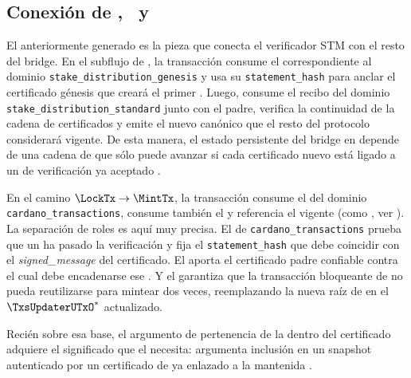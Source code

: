 \subsection{Conexión de \texorpdfstring{\UTxOs, \StakeDistTx\ y \MintTx}{UTxOs, StakeDistTx y MintTx}}

El \ProofReceipt anteriormente generado es la pieza que conecta el verificador STM con el resto del bridge. En el subflujo de \StakeDistribution, la transacción \StakeDistributionGenesisTxTemplate consume el \ProofReceipt correspondiente al dominio \texttt{stake\_distribution\_genesis} y usa su \texttt{statement\_hash} para anclar el certificado génesis que creará el primer \StakeDistributionUTxO. Luego, \StakeDistributionStandardTxTemplate consume el recibo del dominio \texttt{stake\_distribution\_standard} junto con el \StakeDistributionUTxO padre, verifica la continuidad de la cadena de certificados y emite el nuevo \StakeDistributionUTxO canónico que el resto del protocolo considerará vigente. De esta manera, el estado persistente del bridge en \ChainB depende de una cadena de \UTxOs que sólo puede avanzar si cada certificado nuevo está ligado a un \ProofReceipt de verificación \STM ya aceptado \Onchain.

En el camino $\LockTx \rightarrow \MintTx$, la transacción \BridgeMintTxTemplate consume el \ProofReceipt del dominio \texttt{cardano\_transactions}, consume también el \TxsUpdaterUTxO y referencia el \StakeDistributionUTxO vigente (como \ReferenceInput, ver  \cite{CIP0031}). La separación de roles es aquí muy precisa. El \ProofReceipt de \texttt{cardano\_transactions} prueba que un \TransactionSnapshotCertificate ha pasado la verificación \STM y fija el \texttt{statement\_hash} que debe coincidir con el \textit{signed\_message} del certificado. El \StakeDistributionUTxO aporta el certificado padre confiable contra el cual debe encadenarse ese \TransactionSnapshotCertificate. Y el \TxsUpdaterMintingValidator garantiza que la transacción bloqueante de \ChainA no pueda reutilizarse para mintear dos veces, reemplazando la nueva raíz de \SMT en el $\TxsUpdaterUTxO^*$ actualizado.

Recién sobre esa base, el argumento \Groth de pertenencia de la \LockTx dentro del \TransactionSnapshot certificado adquiere el significado que el \zkBridge necesita: argumenta inclusión en un snapshot autenticado por un certificado de \Mithril ya enlazado a la \CertificateChain mantenida \Onchain.
